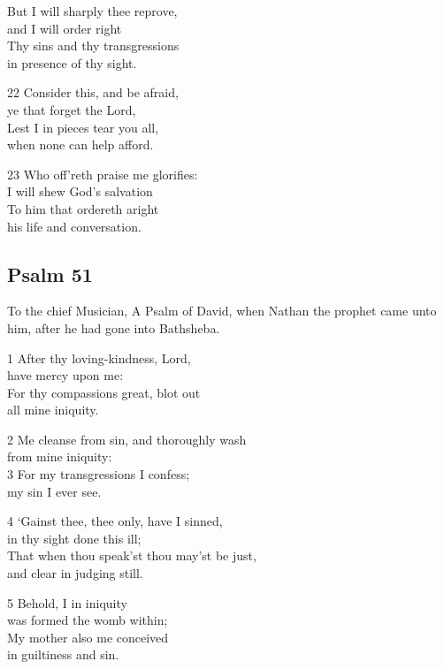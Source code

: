 \begin{multicols}{3}
But I will sharply thee reprove,\\
and I will order right\\
Thy sins and thy transgressions\\
in presence of thy sight.

22 Consider this, and be afraid,\\
ye that forget the Lord,\\
Lest I in pieces tear you all,\\
when none can help afford.

23 Who off’reth praise me glorifies:\\
I will shew God’s salvation\\
To him that ordereth aright\\
his life and conversation.

\begin{center}
\quad{}\quad{}
\end{center}

\subsection*{Psalm 51}

To the chief Musician, A Psalm of David,
when Nathan the prophet came unto him, after he had gone into Bathsheba.

1 After thy loving-kindness, Lord,\\
have mercy upon me:\\
For thy compassions great, blot out\\
all mine iniquity.

2 Me cleanse from sin, and thoroughly wash\\
from mine iniquity:\\
3 For my transgressions I confess;\\
my sin I ever see.

4 ‘Gainst thee, thee only, have I sinned,\\
in thy sight done this ill;\\
That when thou speak’st thou may’st be just,\\
and clear in judging still.

5 Behold, I in iniquity\\
was formed the womb within;\\
My mother also me conceived\\
in guiltiness and sin.


\end{multicols}
